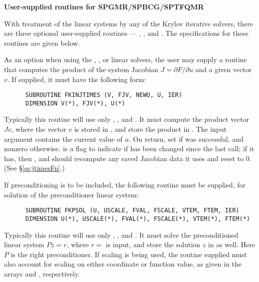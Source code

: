 \begin{Steps}

 {\s}{\p} {\bf User-supplied routines for SPGMR/SPBCG/SPTFQMR}

  With treatment of the linear systems by any of the Krylov iterative
  solvers, there are three optional user-supplied routines ---
  , , and .  The specifications
  for these routines are given below.

  As an option when using the {\spgmr}, {\spbcg}, or {\sptfqmr}  linear solvers, 
  the user may supply a routine that computes the product of the system Jacobian 
  $J = \partial F / \partial u$ 
  and a given vector $v$.  If supplied, it must have the following form:
\begin{verbatim}
      SUBROUTINE FKINJTIMES (V, FJV, NEWU, U, IER)
      DIMENSION V(*), FJV(*), U(*)
\end{verbatim}
  Typically this routine will use only , , and .
  It must compute the product vector $Jv$, where the vector $v$ is
  stored in , and store the product in .  
  The input argument  contains the current value of $u$.  On return, set
   if  was successful, and nonzero otherwise.
   is a flag to indicate if  has been changed since the last
  call; if it has, then , and  should recompute any
  saved Jacobian data it uses and reset  to 0.  (See \S\ref{ss:jtimesFn}.)

  If preconditioning is to be included, the following routine must be
  supplied, for solution of the preconditioner linear system:
\begin{verbatim}
      SUBROUTINE FKPSOL (U, USCALE, FVAL, FSCALE, VTEM, FTEM, IER)
      DIMENSION U(*), USCALE(*), FVAL(*), FSCALE(*), VTEM(*), FTEM(*)
\end{verbatim}
  Typically this routine will use only , ,  and .
  It must solve the preconditioned linear system $Pz = r$, where
  $r = $  is input, and store the solution $z$ in  as well. 
  Here $P$ is the right preconditioner. If scaling is being used, the
  routine supplied must also account for scaling on either coordinate
  or function value, as given in the arrays  and
  , respectively.
  

\end{Steps}
